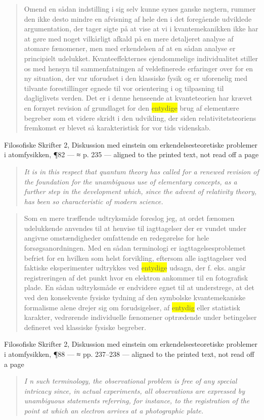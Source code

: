 \documentclass[11pt]{article}
\newcommand{\dcite}[1]{{\nopagebreak\raggedleft\small #1\par}\medskip}
\newcommand{\tlg}[1]{{\setlength{\fboxsep}{0.8pt}\colorbox{yellow}{#1}}}
\newcommand{\olg}[1]{{\setlength{\fboxsep}{0.8pt}\colorbox{cyan!25}{#1}}}
\begin{document}
\begin{quote}
Omend en sådan indstilling i sig selv kunne synes ganske nøgtern, rummer den ikke desto mindre en afvisning af hele den i det foregående udviklede argumentation, der tager sigte på at vise at vi i kvantemekanikken ikke har at gøre med noget vilkårligt afkald på en mere detaljeret analyse af atomare fænomener, men med erkendelsen af at en sådan analyse er principielt udelukket. Kvanteeffekternes ejendommelige individualitet stiller os med hensyn til sammenfatningen af veldefinerede erfaringer over for en ny situation, der var uforudset i den klassiske fysik og er uforenelig med tilvante forestillinger egnede til vor orientering i og tilpasning til dagliglivets verden. Det er i denne henseende at kvanteteorien har krævet en fornyet revision af grundlaget for den \tlg{entydige} brug af elementære begreber som et videre skridt i den udvikling, der siden relativitetsteoriens fremkomst er blevet så karakteristisk for vor tids videnskab.
\end{quote}
\dcite{Filosofiske Skrifter 2, Diskussion med einstein om erkendelsesteoretiske problemer i atomfysikken, ¶82 — ≈ p. 235 — aligned to the printed text, not read off a page}
{\footnotesize\begin{quote}\itshape
It is in this respect that quantum theory has called for a renewed revision of the foundation for the \olg{unambiguous} use of elementary concepts, as a further step in the development which, since the advent of relativity theory, has been so characteristic of modern science.
\end{quote}}

\begin{quote}
Som en mere træffende udtryksmåde foreslog jeg, at ordet fænomen udelukkende anvendes til at henvise til iagttagelser der er vundet under angivne omstændigheder omfattende en redegørelse for hele forsøgsanordningen. Med en sådan terminologi er iagttagelsesproblemet befriet for en hvilken som helst forvikling, eftersom alle iagttagelser ved faktiske eksperimenter udtrykkes ved \tlg{entydige} udsagn, der f. eks. angår registreringen af det punkt hvor en elektron ankommer til en fotografisk plade. En sådan udtryksmåde er endvidere egnet til at understrege, at det ved den konsekvente fysiske tydning af den symbolske kvantemekaniske formalisme alene drejer sig om forudsigelser, af \tlg{entydig} eller statistisk karakter, vedrørende individuelle fænomener optrædende under betingelser defineret ved klassiske fysiske begreber.
\end{quote}
\dcite{Filosofiske Skrifter 2, Diskussion med einstein om erkendelsesteoretiske problemer i atomfysikken, ¶88 — ≈ pp. 237–238 — aligned to the printed text, not read off a page}
{\footnotesize\begin{quote}\itshape
I n such terminology, the observational problem is free of any special intricacy since, in actual experiments, all observations are expressed by \olg{unambiguous} statements referring, for instance, to the registration of the point at which an electron arrives at a photographic plate.
\end{quote}}
\end{document}
